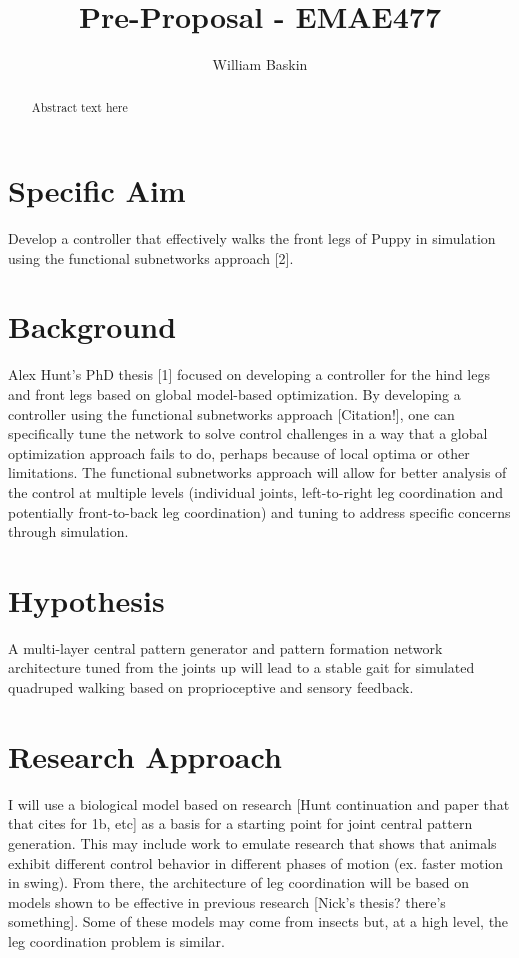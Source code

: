 \documentclass[12pt, letterpaper, oneside, notitlepage, onecolumn]{article}
\author{William Baskin}
\title{Pre-Proposal - EMAE477}
\begin{document}
\maketitle

\begin{abstract}
Abstract text here
\end{abstract}

\newpage

\section*{Specific Aim}

Develop a controller that effectively walks the front legs of Puppy in simulation using the functional subnetworks approach [2].

\section{Background}

Alex Hunt's PhD thesis [1] focused on developing a controller for the hind legs and front legs based on global model-based optimization. By developing a controller using the functional subnetworks approach [Citation!], one can specifically tune the network to solve control challenges in a way that a global optimization approach fails to do, perhaps because of local optima or other limitations. The functional subnetworks approach will allow for better analysis of the control at multiple levels (individual joints, left-to-right leg coordination and potentially front-to-back leg coordination) and tuning to address specific concerns through simulation.

\section{Hypothesis}

A multi-layer central pattern generator and pattern formation network architecture tuned from the joints up will lead to a stable gait for simulated quadruped walking based on proprioceptive and sensory feedback.

\section{Research Approach}

I will use a biological model based on research [Hunt continuation and paper that that cites for 1b, etc] as a basis for a starting point for joint central pattern generation. This may include work to emulate research that shows that animals exhibit different control behavior in different phases of motion (ex. faster motion in swing). From there, the architecture of leg coordination will be based on models shown to be effective in previous research [Nick's thesis? there's something]. Some of these models may come from insects but, at a high level, the leg coordination problem is similar.
\end{document}
